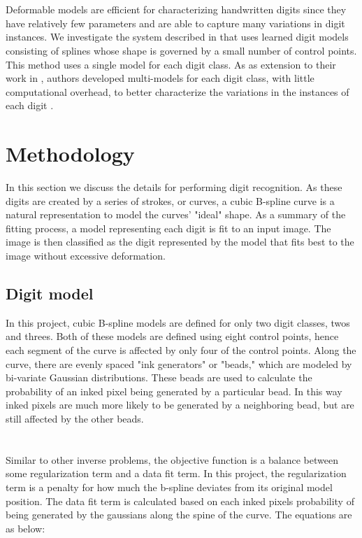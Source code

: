 \documentclass[oribibl]{llncs}
\begin{document}
\\
\\
Deformable models are efficient for characterizing handwritten digits since they have
relatively few parameters and are able to capture many variations in digit instances. We investigate the system described in \cite{Hinton92adaptiveelastic} that uses learned digit models consisting of splines whose shape is governed by a small number of control points. This method uses a single model for each digit class. As as extension to their work in \cite{Hinton92adaptiveelastic}, authors developed multi-models for each digit class, with little computational overhead, to better characterize the variations in the instances of each digit \cite{revow1993using}. 


\section{Methodology}
\label{sec:methodology}

In this section we discuss the details for performing digit recognition.
As these digits are created by a series of strokes, or curves, a cubic B-spline curve is a natural representation to model the curves' "ideal" shape. As a summary of the fitting process, a model representing each digit is fit to an input image. The image is then classified as the digit represented by the model that fits best to the image without excessive deformation.

\subsection{Digit model}
In this project, cubic B-spline models are defined for only two digit classes, twos and threes. Both of these models are defined using eight control points, hence each segment of the curve is affected by only four of the control points. Along the curve, there are evenly spaced "ink generators" or "beads," which are modeled by bi-variate Gaussian distributions. These beads are used to calculate the probability of an inked pixel being generated by a particular bead. In this way inked pixels are much more likely to be generated by a neighboring bead, but are still affected by the other beads. 
\\
\\
\\
Similar to other inverse problems, the objective function is a balance between some regularization term and a data fit term. In this project, the regularization term is a penalty for how much the b-spline deviates from its original model position. The data fit term is calculated based on each inked pixels probability of being generated by the gaussians along the spine of the curve. The equations are as below:
\end{document}
